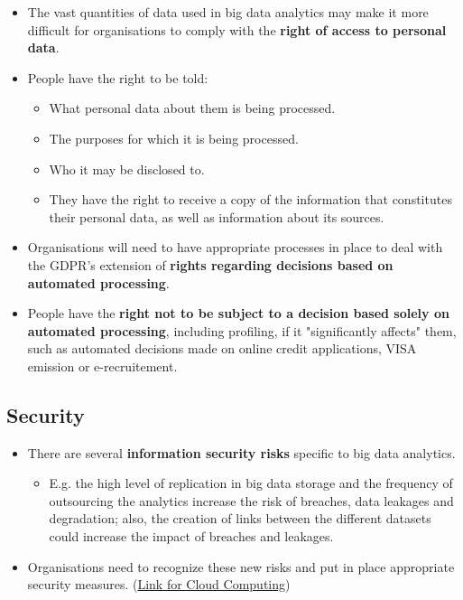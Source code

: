 \documentclass[a4paper]{article}
\begin{document}
		\begin{itemize}
			\item The vast quantities of data used in big data analytics may make it more difficult for organisations to comply with the \textbf{right of access to personal data}.
			\item People have the right to be told:
				\begin{itemize}
					\item What personal data about them is being processed.
					\item The purposes for which it is being processed.
					\item Who it may be disclosed to.
					\item They have the right to receive a copy of the information that constitutes their personal data, as well as information about its sources.
				\end{itemize}
			\item Organisations will need to have appropriate processes in place to deal with the GDPR's extension of \textbf{rights regarding decisions based on automated processing}.
			\item People have the \textbf{right not to be subject to a decision based solely on automated processing}, including profiling, if it "significantly affects" them, such as automated decisions made on online credit applications, VISA emission or e-recruitement.
		\end{itemize}
	
		\subsection{Security}
		
		\begin{itemize}
			\item There are several \textbf{information security risks} specific to big data analytics.
				\begin{itemize}
					\item E.g. the high level of replication in big data storage and the frequency of outsourcing the analytics increase the risk of breaches, data leakages and degradation; also, the creation of links between the different datasets could increase the impact of breaches and leakages.
				\end{itemize}
			\item Organisations need to recognize these new risks and put in place appropriate security measures. (\href{https://ico.org.uk/media/for-organisations/documents/1540/cloud_computing_guidance_for_organisations.pdf}{Link for Cloud Computing})
		\end{itemize}
	
\end{document}
